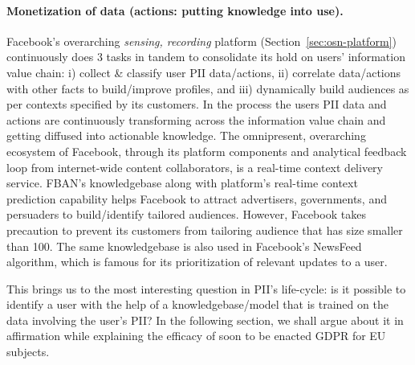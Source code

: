 \documentclass[a4paper,twoside]{article}
\begin{document}
\paragraph{Monetization of data (actions: putting knowledge into use).}
Facebook's overarching \textit{sensing, recording} platform
(Section~\ref{sec:osn-platform}) continuously does 3 tasks in tandem
to consolidate its hold on users' information value chain: i) collect
\& classify user PII data/actions, ii) correlate data/actions with
other facts to build/improve profiles, and iii) dynamically build
audiences as per contexts specified by its customers. In the process
the users PII data and actions are continuously transforming across
the information value chain and getting diffused into actionable
knowledge. The omnipresent, overarching ecosystem of Facebook, through
its platform components and analytical feedback loop from
internet-wide content collaborators, is a real-time context delivery
service. FBAN's knowledgebase along with platform's real-time context
prediction capability helps Facebook to attract advertisers,
governments, and persuaders to build/identify tailored
audiences. However, Facebook takes precaution to prevent its customers
from tailoring audience that has size smaller than 100. The same
knowledgebase is also used in Facebook's NewsFeed algorithm, which is
famous for its prioritization of relevant updates to a user.

This brings us to the most interesting question in PII's life-cycle:
is it possible to identify a user with the help of a
knowledgebase/model that is trained on the data involving the user's
PII? In the following section, we shall argue about it in affirmation
while explaining the efficacy of soon to be enacted GDPR for EU
subjects.



\end{document}
